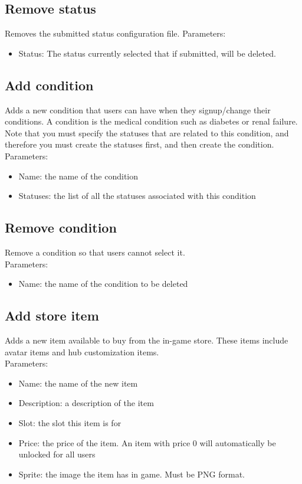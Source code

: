 \documentclass[a4paper,12pt]{article}
\begin{document}
\subsection*{Remove status}
Removes the submitted status configuration file.
Parameters:
\begin{itemize}
	\setlength\itemsep{0em}
	\item Status: The status currently selected that if submitted, will be deleted.
\end{itemize}

\subsection*{Add condition}
Adds a new condition that users can have when they signup/change their conditions.
A condition is the medical condition such as diabetes or renal failure.
Note that you must specify the statuses that are related to this condition, and therefore you must create the statuses
first, and then create the condition.
Parameters:                                                                                                                                                                       
\begin{itemize}
	\setlength\itemsep{0em}
	\item Name: the name of the condition
	\item Statuses: the list of all the statuses associated with this condition
\end{itemize}

\subsection*{Remove condition}
Remove a condition so that users cannot select it.\\
Parameters:                                                                                                                                                                       
\begin{itemize}
	\setlength\itemsep{0em}
	\item Name: the name of the condition to be deleted
\end{itemize}

\subsection*{Add store item}
Adds a new item available to buy from the in-game store. These items include avatar items and hub customization items.\\
Parameters:
\begin{itemize}
	\setlength\itemsep{0em}
	\item Name: the name of the new item
	\item Description: a description of the item
	\item Slot: the slot this item is for
	\item Price: the price of the item. An item with price 0 will automatically be unlocked for all users
	\item Sprite: the image the item has in game. Must be PNG format.
\end{itemize}	
\end{document}
